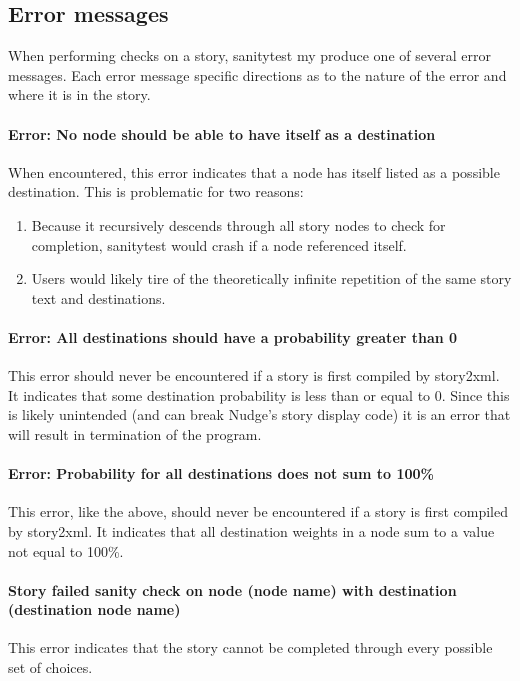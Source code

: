 \documentclass[12pt,letterpaper]{article}
\begin{document}
 \subsection{Error messages}
 When performing checks on a story, sanitytest my produce one of several error messages. Each error message 
 specific directions as to the nature of the error and where it is in the story.
 
 \paragraph{Error: No node should be able to have itself as a destination}
 When encountered, this error indicates that a node has itself listed as a possible destination. This is problematic
 for two reasons: 
 \begin{enumerate}
 \item Because it recursively descends through all story nodes to check for completion, sanitytest would crash if a node referenced itself.
 \item Users would likely tire of the theoretically infinite repetition of the same story text and destinations.
 \end{enumerate}
 
 \paragraph{Error: All destinations should have a probability greater than 0}
 This error should never be encountered if a story is first compiled by story2xml. It indicates that some destination
 probability is less than or equal to 0. Since this is likely unintended (and can break Nudge's story display code)
 it is an error that will result in termination of the program.
 
 \paragraph{Error: Probability for all destinations does not sum to 100\%}
 This error, like the above, should never be encountered if a story is first compiled by story2xml. It indicates that 
 all destination weights in a node sum to a value not equal to 100\%.
 
 \paragraph{Story failed sanity check on node (node name) with destination (destination node name)}
 This error indicates that the story cannot be completed through every possible set of choices.
 
\end{document}
